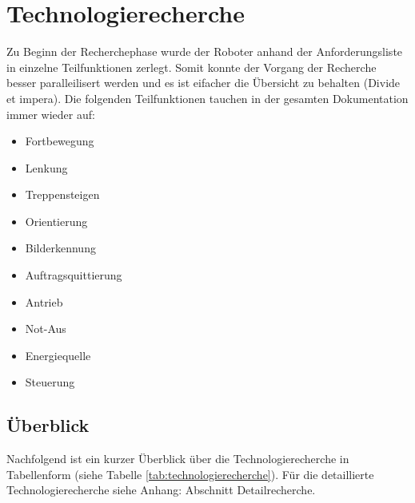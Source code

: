 \newpage
\section*{Technologierecherche}
Zu Beginn der Recherchephase wurde der Roboter anhand der Anforderungsliste in einzelne Teilfunktionen zerlegt. Somit konnte der Vorgang der Recherche besser paralleilisert werden und es ist eifacher die Übersicht zu behalten (Divide et impera). Die folgenden Teilfunktionen tauchen in der gesamten Dokumentation immer wieder auf:
\begin{itemize}
    \item Fortbewegung
    \item Lenkung
    \item Treppensteigen
    \item Orientierung
    \item Bilderkennung
    \item Auftragsquittierung
    \item Antrieb
    \item Not-Aus
    \item Energiequelle
    \item Steuerung
\end{itemize}
\subsection*{Überblick}
Nachfolgend ist ein kurzer Überblick über die Technologierecherche in Tabellenform (siehe Tabelle \ref{tab:technologierecherche}). Für die detaillierte Technologierecherche siehe Anhang: Abschnitt Detailrecherche.

